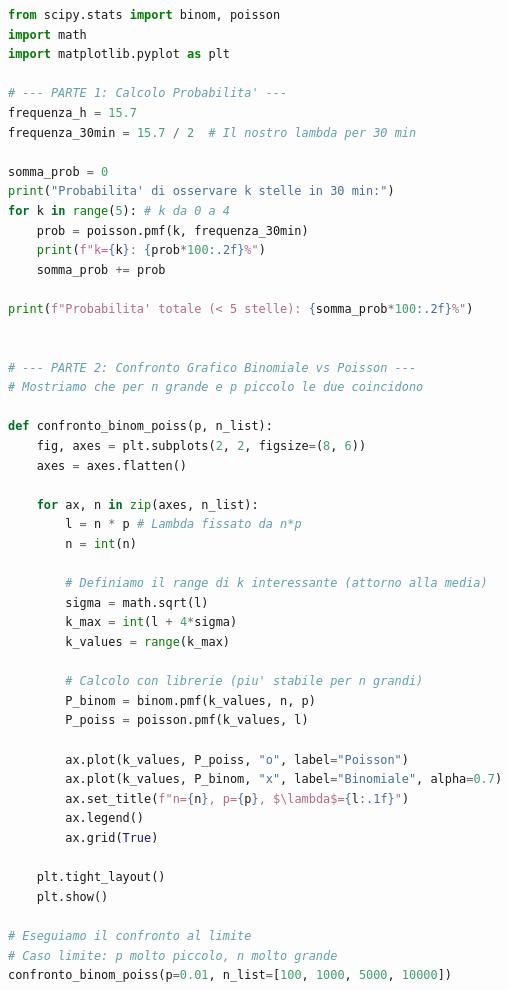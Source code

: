 \documentclass{article}
\theoremstyle{remark}
\begin{document}
\begin{lstlisting}[language=Python, frame=single, caption={Calcolo Poisson e confronto con Binomiale}]
from scipy.stats import binom, poisson
import math
import matplotlib.pyplot as plt

# --- PARTE 1: Calcolo Probabilita' ---
frequenza_h = 15.7
frequenza_30min = 15.7 / 2  # Il nostro lambda per 30 min

somma_prob = 0
print("Probabilita' di osservare k stelle in 30 min:")
for k in range(5): # k da 0 a 4
    prob = poisson.pmf(k, frequenza_30min)
    print(f"k={k}: {prob*100:.2f}%")
    somma_prob += prob

print(f"Probabilita' totale (< 5 stelle): {somma_prob*100:.2f}%")


# --- PARTE 2: Confronto Grafico Binomiale vs Poisson ---
# Mostriamo che per n grande e p piccolo le due coincidono

def confronto_binom_poiss(p, n_list):
    fig, axes = plt.subplots(2, 2, figsize=(8, 6))
    axes = axes.flatten()

    for ax, n in zip(axes, n_list):
        l = n * p # Lambda fissato da n*p
        n = int(n)
        
        # Definiamo il range di k interessante (attorno alla media)
        sigma = math.sqrt(l)
        k_max = int(l + 4*sigma)
        k_values = range(k_max)

        # Calcolo con librerie (piu' stabile per n grandi)
        P_binom = binom.pmf(k_values, n, p)
        P_poiss = poisson.pmf(k_values, l)

        ax.plot(k_values, P_poiss, "o", label="Poisson")
        ax.plot(k_values, P_binom, "x", label="Binomiale", alpha=0.7)
        ax.set_title(f"n={n}, p={p}, $\lambda$={l:.1f}")
        ax.legend()
        ax.grid(True)
    
    plt.tight_layout()
    plt.show()

# Eseguiamo il confronto al limite
# Caso limite: p molto piccolo, n molto grande
confronto_binom_poiss(p=0.01, n_list=[100, 1000, 5000, 10000])
\end{lstlisting}
\end{document}

